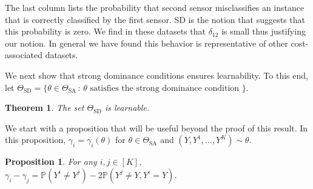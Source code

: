 \documentclass[11pt]{article} %
\newcommand{\SA}{\mathrm{SA}}
\newcommand{\SD}{\mathrm{SD}}
\newcommand{\TSA}{\Theta_{\SA}}
\newcommand{\TSD}{\Theta_{\SD}}
\newcommand{\Prob}[1]{\mathbb{P}\left(#1\right)}
\newtheorem{thm}{Theorem}
\newtheorem{prop}{Proposition}
\begin{document}
The last column lists the probability that second sensor misclassifies an instance that is correctly classified by the first sensor. SD is the notion that suggests that this probability is zero. We find in these datasets that $\delta_{12}$ is small thus justifying our notion. In general we have found this behavior is representative of other cost-associated datasets. %



We next show that strong dominance conditions ensures learnability. To this end,
let $\TSD = \{ \theta\in \TSA\,:\, \theta \text{ satisfies the strong dominance condition } \}$.

\begin{thm}
\label{thm:tsdlearnable}
The set $\TSD$ is learnable.
\end{thm}
We start with a proposition that will be useful beyond the proof of this result.
In this proposition, $\gamma_i = \gamma_i(\theta)$ for $\theta \in \TSA$ and $(Y,Y^1,\dots,Y^K) \sim \theta$.
\begin{prop}\label{prop:gammadiff}
For any $i,j\in [K]$, $\gamma_i - \gamma_j = \Prob{Y^i\ne Y^j} - 2\Prob{ Y^j \ne Y, Y^i=Y}$.
\end{prop}
\end{document}
